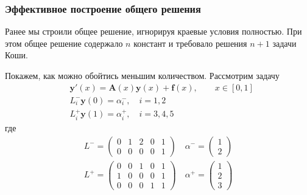 \documentclass[professionalfonts,compress,unicode,aspectratio=169]{beamer}
\begin{document}
\begin{frame}\frametitle{Эффективное построение общего решения}
	Ранее мы строили общее решение, игнорируя краевые условия полностью. При
	этом общее решение содержало $n$ констант и требовало решения $n+1$ задачи
	Коши.

	Покажем, как можно обойтись меньшим количеством.
	Рассмотрим задачу
	\begin{align*}
	&\mathbf{y}'(x) = \mathbf{A}(x) \mathbf{y}(x) + \mathbf{f}(x), \qquad x \in
	[0,1]\\
	&L_{i}^{-} \mathbf{y}(0) = \alpha_i^{-}, \quad i = 1,2\\
	&L_{i}^{+} \mathbf{y}(1) = \alpha_i^{+}, \quad i = 3,4,5
	\end{align*}
	где
	\begin{gather*}
	L^{-} = 
	\begin{pmatrix}
	0 & 1 & 2 & 0 & 1\\
	0 & 0 & 0 & 0 & 1
	\end{pmatrix}
	\quad
	\alpha^{-} = \begin{pmatrix} 1 \\ 2 \end{pmatrix}\\
	L^{+} = 
	\begin{pmatrix}
	0 & 0 & 1 & 0 & 1\\
	1 & 0 & 0 & 0 & 1\\
	0 & 0 & 0 & 1 & 1
	\end{pmatrix}
	\quad
	\alpha^{+} = \begin{pmatrix} 1 \\ 2 \\ 3\end{pmatrix}
	\end{gather*}
\end{frame}
\end{document}

